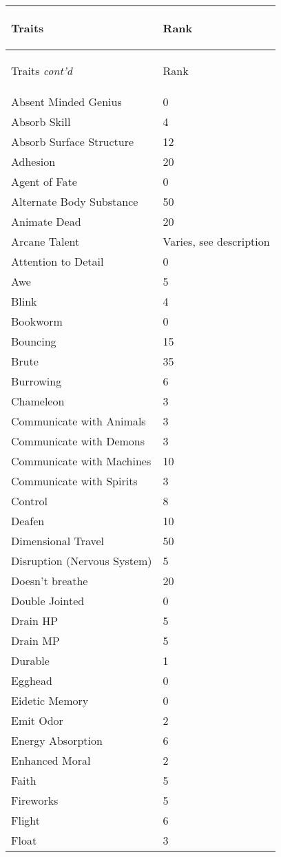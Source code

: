 \documentclass[twoside]{book}
\begin{document}
\begin{longtable}{p{1.25in}l} 
  Traits& \begin{turn}{70}{Rank}\end{turn}
          \\
  \hline
  \hline
  \endfirsthead
  Traits \textit{cont'd}
        & \begin{turn}{70}{Rank}\end{turn}
           \\
  \hline
  \endhead
\raggedright Absent Minded Genius & 0 \tabularnewline
      \raggedright Absorb Skill & 4 \tabularnewline
      \raggedright Absorb Surface Structure
           & 12 \tabularnewline
      \raggedright Adhesion & 20 \tabularnewline
      \raggedright Agent of Fate & 0 \tabularnewline
      \raggedright Alternate Body Substance
           & 50 \tabularnewline
      \raggedright Animate Dead & 20 \tabularnewline
      \raggedright Arcane Talent & Varies, see
           description \tabularnewline
      \raggedright Attention to Detail & 0 \tabularnewline
      \raggedright Awe & 5 \tabularnewline
      \raggedright Blink & 4 \tabularnewline
      \raggedright Bookworm & 0 \tabularnewline
      \raggedright Bouncing & 15 \tabularnewline
      \raggedright Brute & 35 \tabularnewline
      \raggedright Burrowing & 6 \tabularnewline
      \raggedright Chameleon & 3 \tabularnewline
      \raggedright Communicate with Animals
           & 3 \tabularnewline
      \raggedright Communicate with Demons
           & 3 \tabularnewline
      \raggedright Communicate with Machines
           & 10 \tabularnewline
      \raggedright Communicate with Spirits
           & 3 \tabularnewline
      \raggedright Control & 8 \tabularnewline
      \raggedright Deafen & 10 \tabularnewline
      \raggedright Dimensional Travel & 50 \tabularnewline
      \raggedright Disruption (Nervous System)
           & 5 \tabularnewline
      \raggedright Doesn't breathe & 20 \tabularnewline
      \raggedright Double Jointed & 0 \tabularnewline
      \raggedright Drain HP & 5 \tabularnewline
      \raggedright Drain MP & 5 \tabularnewline
      \raggedright Durable & 1 \tabularnewline
      \raggedright Egghead & 0 \tabularnewline
      \raggedright Eidetic Memory & 0 \tabularnewline
      \raggedright Emit Odor & 2 \tabularnewline
      \raggedright Energy Absorption & 6 \tabularnewline
      \raggedright Enhanced Moral & 2 \tabularnewline
      \raggedright Faith & 5 \tabularnewline
      \raggedright Fireworks & 5 \tabularnewline
      \raggedright Flight & 6 \tabularnewline
      \raggedright Float & 3 \tabularnewline

\end{longtable}
\end{document}
